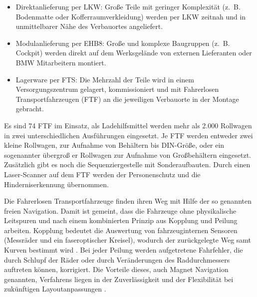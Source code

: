 \begin{itemize}
\item Direktanlieferung per LKW:
Gro\ss e Teile mit geringer Komplexit\"at (z.~B. Bodenmatte oder Kofferraumverkleidung) werden per LKW zeitnah und in unmittelbarer N\"ahe des Verbauortes angeliefert.
\item Modulanlieferung per EHB8:
Gro\ss e und komplexe Baugruppen (z.~B. Cockpit) werden direkt auf dem Werksgel\"ande von externen Lieferanten oder BMW Mitarbeitern montiert.
\item Lagerware per FTS:
Die Mehrzahl der Teile wird in einem Versorgungszentrum gelagert, kommissioniert und mit Fahrerlosen Transportfahrzeugen (FTF) 
an die jeweiligen Verbauorte in der Montage gebracht\cite[S. 36]{Guenther:2011}.
\end{itemize}
Es sind 74 FTF im Einsatz, als Ladehilfsmittel werden mehr als 2.000 Rollwagen in zwei unterschiedlichen Ausf\"uhrungen eingesetzt.
Je FTF werden entweder zwei kleine Rollwagen, zur Aufnahme von Beh\"altern bis DIN-Gr\"o\ss e, oder ein sogenannter \"ubergro\ss 
er Rollwagen zur Aufnahme von Gro\ss beh\"altern eingesetzt.
Zus\"atzlich gibt es noch die Sequenziergestelle mit Sonderaufbauten\cite[S. 37]{Guenther:2011}.
Durch einen Laser-Scanner auf dem FTF werden der Personenschutz und die Hinderniserkennung \"ubernommen. 

Die Fahrerlosen Transportfahrzeuge finden ihren Weg mit Hilfe der so genannten freien Navigation.
Damit ist gemeint, dass die Fahrzeuge ohne physikalische Leitspuren und nach einem kombinierten Prinzip aus Kopplung und Peilung arbeiten.
Kopplung bedeutet die Auswertung von fahrzeuginternen Sensoren (Messr\"ader und ein faseroptischer Kreisel), wodurch der 
zur\"uckgelegte Weg samt Kurven bestimmt wird \cite[S. 37]{Guenther:2011}.
Bei jeder Peilung werden aufgetretene Fahrfehler, die durch Schlupf der R\"ader oder durch Ver\"anderungen des Raddurchmessers auftreten k\"onnen, korrigiert.
Die Vorteile dieses, auch Magnet Navigation genannten, Verfahrens liegen in der Zuverl\"assigkeit und der Flexibilit\"at bei 
zuk\"unftigen Layoutanpassungen \cite[S. 37]{Guenther:2011}.